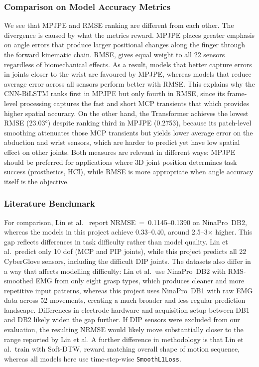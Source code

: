 \documentclass[11pt]{article}
\begin{document}
\subsubsection{Comparison on Model Accuracy Metrics}
\label{sec:rmse_divergence}

We see that MPJPE and RMSE ranking are different from each other. The divergence is caused by what the metrics reward. MPJPE places greater emphasis on angle errors that produce larger positional changes along the finger through the forward kinematic chain. RMSE, gives equal weight to all 22 sensors regardless of biomechanical effects. As a result, models that better capture errors in joints closer to the wrist are favoured by MPJPE, whereas models that reduce average error across all sensors perform better with RMSE. This explains why the CNN-BiLSTM ranks first in MPJPE but only fourth in RMSE, since its frame-level processing captures the fast and short MCP transients that which provides higher spatial accuracy. On the other hand, the Transformer achieves the lowest RMSE (23.03°) despite ranking third in MPJPE (0.2753), because its patch-level smoothing attenuates those MCP transients but yields lower average error on the abduction and wrist sensors, which are harder to predict yet have low spatial effect on other joints. Both measures are relevant in different ways: MPJPE should be preferred for applications where 3D joint position determines task success (prosthetics, HCI), while RMSE is more appropriate when angle accuracy itself is the objective.


\subsubsection{Literature Benchmark}
\label{sec:lit_comparison}

For comparison, Lin et al.\ \cite{lin2025parallel} report NRMSE~=~0.1145--0.1390 on NinaPro~DB2, whereas the models in this project achieve 0.33--0.40, around 2.5--3$\times$ higher. This gap reflects differences in task difficulty rather than model quality. Lin et al.\ predict only 10 \gls{dof} (MCP and PIP joints), while this project predicts all 22 CyberGlove sensors, including the difficult DIP joints. The datasets also differ in a way that affects modelling difficulty: Lin et al.\ use NinaPro~DB2 with RMS-smoothed EMG from only eight grasp types, which produces cleaner and more repetitive input patterns, whereas this project uses NinaPro~DB1 with raw EMG data across 52 movements, creating a much broader and less regular prediction landscape. Differences in electrode hardware and acquisition setup between DB1 and DB2 likely widen the gap further. If DIP sensors were excluded from our evaluation, the resulting NRMSE would likely move substantially closer to the range reported by Lin et al. A further difference in methodology is that Lin et al.\ train with Soft-DTW, reward matching overall shape of motion sequence, whereas all models here use time-step-wise \texttt{SmoothL1Loss}.
\end{document}
